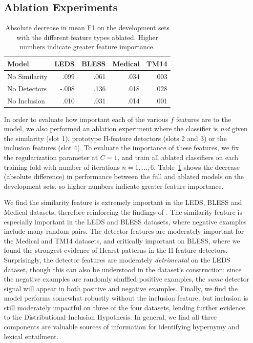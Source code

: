 \subsection{Ablation Experiments}
\begin{table}
\centering
\begin{tabular}{|l|rrrr|}
  \hline
  Model         &      LEDS   &      BLESS  &      Medical  &      TM14   \\
  \hline
  No Similarity &      .099   &      .061   &      .034     &      .003   \\
  No Detectors  &     -.008   &      .136   &      .018     &      .028   \\
  No Inclusion  &      .010   &      .031   &      .014     &      .001   \\
  \hline
\end{tabular}
\caption{Absolute decrease in mean F1 on the development sets with the
different feature types ablated. Higher numbers indicate greater feature
importance.}

\label{tab:ablation}
\end{table}

In order to evaluate how important each of the various $f$ features are to the
model, we also performed an ablation experiment where the classifier is {\em
not} given the similarity (slot 1), prototype H-feature detectors (slots 2 and
3) or the inclusion features (slot 4). To evaluate the importance of these
features, we fix the regularization parameter at $C = 1$, and train all
ablated classifiers on each training fold with number of iterations
$n = {1, \ldots, 6}$. Table~\ref{tab:ablation} shows the decrease (absolute difference) in performance
between the full and ablated models on the development sets, so higher numbers indicate greater
feature importance.

We find the similarity feature is extremely important in the LEDS, BLESS and
Medical datasets, therefore reinforcing the findings of
. The similarity feature is especially important in
the LEDS and BLESS datasets, where negative examples include many random
pairs. The detector features are moderately important for the Medical and TM14 datasets,
and critically important on BLESS, where we found the strongest evidence
of Hearst patterns in the H-feature detectors.
Surprisingly, the detector features are moderately {\em detrimental} on the
LEDS dataset, though this can also be understood in the dataset's construction:
since the negative examples are randomly shuffled positive examples, the
{\em same} detector signal will appear in both positive and negative examples.
Finally, we find the model performs somewhat robustly without the inclusion
feature, but inclusion is still moderately impactful on three of the four datasets,
lending further evidence to the Distributional Inclusion Hypothesis.
In general, we find all three components are valuable sources of information
for identifying hypernymy and lexical entailment.

